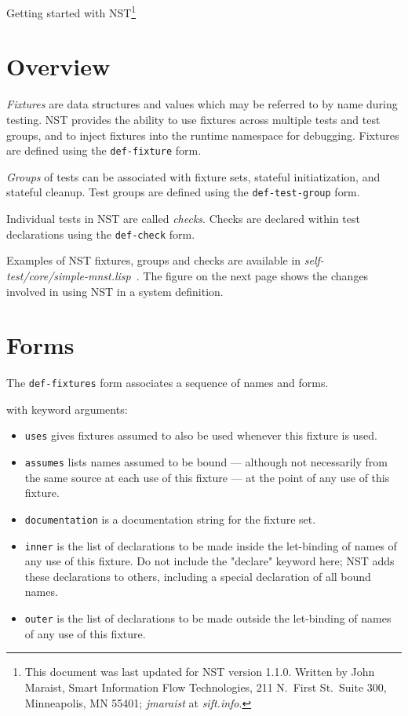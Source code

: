 \documentclass{article}
\begin{document}
\thispagestyle{empty}
\begin{center}
  \LARGE Getting started with NST\footnote{This document was last
    updated for NST version 1.1.0.  Written by John Maraist, Smart
    Information Flow Technologies, 211 N.\ First St.\ Suite 300,
    Minneapolis, MN 55401; \textsl{jmaraist} at \textsl{sift.info}.}
\end{center}

\section*{Overview}
\emph{Fixtures} are data structures and values which may be referred
to by name during testing.  NST provides the ability to use fixtures
across multiple tests and test groups, and to inject fixtures into the
runtime namespace for debugging.  Fixtures are defined using the
\texttt{def-fixture} form.

\emph{Groups} of tests can be associated with fixture sets, stateful
initiatization, and stateful cleanup.  Test groups are defined using
the \texttt{def-test-group} form.

Individual tests in NST are called \emph{checks}.  Checks are declared
within test declarations using the \texttt{def-check} form.

Examples of NST fixtures, groups and checks
are available in \textsl{self-test/core/simple-mnst.lisp}~.  The
figure on the next page shows the changes involved in using NST in a
system definition.

\section*{Forms}
The \texttt{def-fixtures} form associates a sequence of names and
forms.

with keyword arguments:
\begin{itemize}

\item\texttt{uses} gives fixtures assumed to also be used whenever
  this fixture is used.

\item\texttt{assumes} lists names assumed to be bound --- although not
  necessarily from the same source at each use of this fixture --- at
  the point of any use of this fixture.

\item\texttt{documentation} is a documentation string for the fixture
  set.

\item\texttt{inner} is the list of declarations to be made inside the
  let-binding of names of any use of this fixture.  Do not include the
  "declare" keyword here; NST adds these declarations to others,
  including a special declaration of all bound names.

\item\texttt{outer} is the list of declarations to be made outside the
  let-binding of names of any use of this fixture.
\end{itemize}
\end{document}
